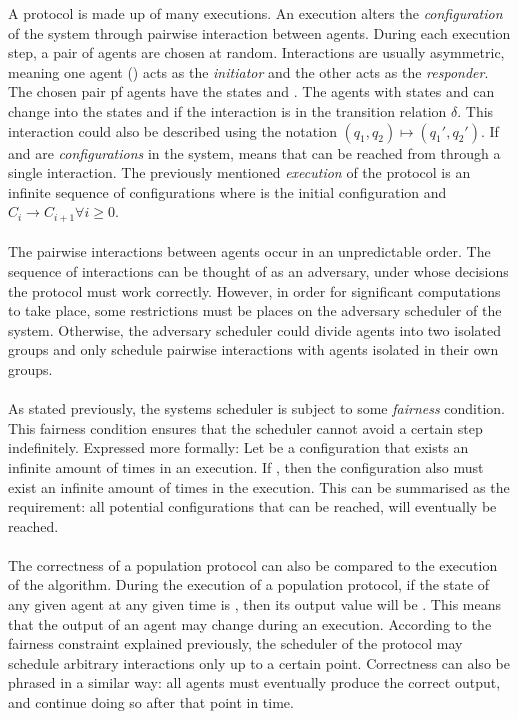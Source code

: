 A protocol is made up of many executions. An execution alters the \emph{configuration} of the system through pairwise interaction between agents. During each execution step, a pair of agents  are chosen at random. Interactions are usually asymmetric, meaning one agent () acts as the \emph{initiator} and the other  acts as the \emph{responder}. The chosen pair pf agents have the states  and . The agents with states  and  can change into the states  and  if the interaction  is in the transition relation $\delta$. This interaction could also be described using the notation $(q_1, q_2) \mapsto (q_1', q_2')$.  If  and  are \emph{configurations} in the system,  means that  can be reached from  through a single interaction. The previously mentioned \emph{execution} of the protocol is an infinite sequence of configurations  where  is the initial configuration and $C_i \rightarrow C_{i+1} \forall i \geq 0$. 
\\\\
The pairwise interactions between agents occur in an unpredictable order. The sequence of interactions can be thought of as an adversary, under whose decisions the protocol must work correctly. However, in order for significant computations to take place, some restrictions must be places on the adversary scheduler of the system. Otherwise, the adversary scheduler could divide agents into two isolated groups and only schedule pairwise interactions with agents isolated in their own groups.  
\\\\
As stated previously, the systems scheduler is subject to some \emph{fairness} condition. This fairness condition ensures that the scheduler cannot avoid a certain step indefinitely. Expressed more formally: Let  be a configuration that exists an infinite amount of times in an execution. If , then the configuration  also must exist an infinite amount of times in the execution. This can be summarised as the requirement: all potential configurations that can be reached, will eventually be reached.
\\\\ 
The correctness of a population protocol can also be compared to the execution of the algorithm. During the execution of a population protocol, if the state of any given agent at any given time is , then its output value will be . This means that the output of an agent may change during an execution. According to the fairness constraint explained previously, the scheduler of the protocol may schedule arbitrary interactions only up to a certain point. Correctness can also be phrased in a similar way: all agents must eventually produce the correct output, and continue doing so after that point in time.






